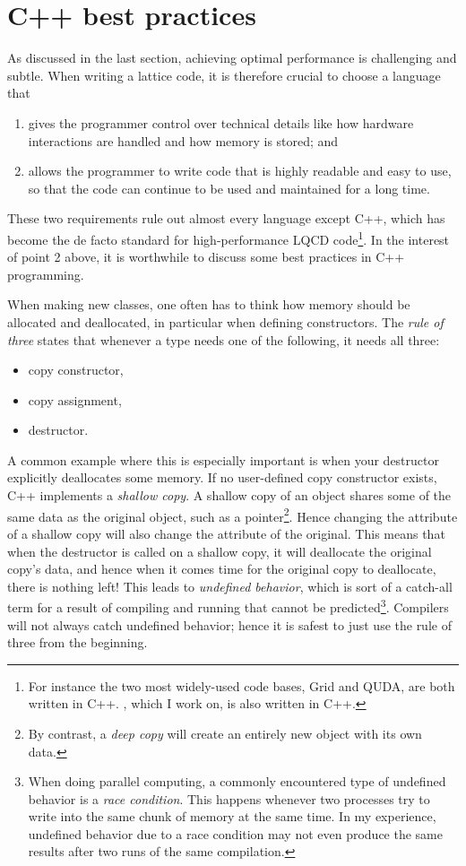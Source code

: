 \section{C++ best practices}

As discussed in the last section, achieving optimal performance is challenging
and subtle. When writing a lattice code, it is therefore crucial to choose
a language that
\begin{enumerate}
  \item gives the programmer control over technical details like how hardware
interactions are handled and how memory is stored; and
  \item allows the programmer to write code that is highly readable and
easy to use, so that the code can continue to be used and maintained
for a long time.
\end{enumerate}
These two requirements rule out almost every language except C++, which has
become the de facto standard for high-performance LQCD code\footnote{For
instance the two most widely-used code bases, Grid and QUDA, are both
written in C++. \simulat, which I work on, is also written in C++.}.
In the interest of point 2 above, it is worthwhile to discuss some
best practices in C++ programming.

When making new classes, one often has to think how memory should be allocated
and deallocated, in particular when defining constructors. The {\it rule of
three} states that whenever a type needs one of the
following, it needs all three:
\begin{itemize}
  \item copy constructor,
  \item copy assignment,
  \item destructor.
\end{itemize}
A common example where this is especially important is when your destructor 
explicitly deallocates some memory. If no user-defined copy constructor exists,
C++ implements a {\it shallow copy}. A shallow copy of an
object shares some of the same data as the original object, such as a 
pointer\footnote{By contrast, a {\it deep copy} will create
an entirely new object with its own data.}.
Hence changing the attribute of a shallow copy will also change the attribute of
the original. This means that when the destructor is called on a shallow copy,
it will deallocate the original copy's data, and hence when it comes time for
the original copy to deallocate, there is nothing left!
This leads to {\it undefined behavior}, which is sort
of a catch-all term for a result of compiling and running that cannot be
predicted\footnote{When doing parallel computing, a commonly encountered type of
undefined behavior is a {\it race condition}. 
This happens whenever two
processes try to write into the same chunk of memory at the same time. In my
experience, undefined behavior due to a race condition may not even produce the
same results after two runs of the same compilation.}. Compilers will not always
catch undefined behavior; hence it is safest to just use the rule of three from
the beginning.

